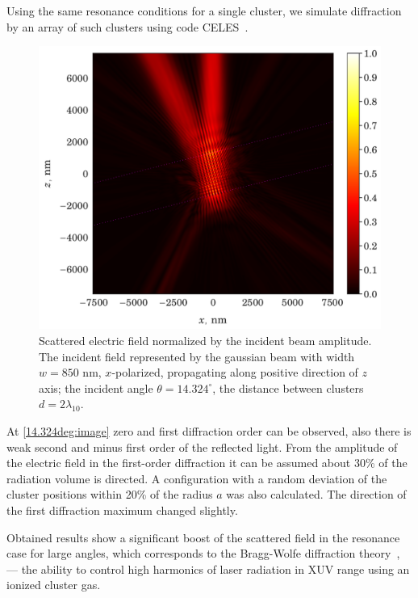 \documentclass[conference]{IEEEtran}
\begin{document}
Using the same resonance conditions for a single cluster, we simulate diffraction by an array of such clusters using code CELES~\cite{celes}.






\begin{figure}[htbp]
	\centerline{\includegraphics[width=0.71\columnwidth, trim={0 0.15cm 0 0.2cm},clip]{../components/img/celes/reference_regular_14.324}}
	\caption{Scattered electric field normalized by the incident beam amplitude. The incident field represented by the gaussian beam with width $w = 850$ nm, $x$-polarized, propagating along positive direction of $z$ axis; the incident angle $\theta = 14.324^{\circ}$, the distance between clusters $d = 2\lambda_{10}$.}\label{14.324deg:image}
\end{figure}

At \autoref{14.324deg:image} zero and first diffraction order can be
observed, also there is weak second and minus first order of the reflected light. From the amplitude of the electric field in the first-order diffraction it can be assumed about 30\% of the radiation volume is directed. A configuration with a random deviation of the cluster positions within 20\% of the radius $a$ was also calculated. The direction of the first diffraction maximum changed slightly.

Obtained results show a significant boost of the scattered field in the resonance case for large angles, which corresponds to the Bragg-Wolfe diffraction theory~\cite{boren_huffman}, --- the ability to control high harmonics of laser radiation in XUV range using an ionized cluster gas.



\end{document}
